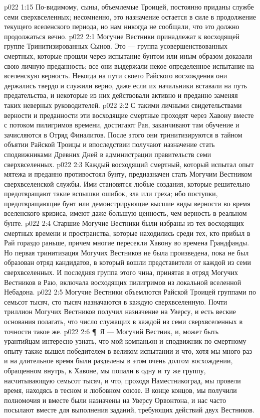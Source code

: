 \vs p022 1:15 По\hyp{}видимому, сыны, объемлемые Троицей, постоянно приданы службе семи сверхвселенных; несомненно, это назначение остается в силе в продолжение текущего вселенского периода, но нам никогда не сообщали, что это должно продолжаться вечно.
\vs p022 2:1 Могучие Вестники принадлежат к восходящей группе Тринитизированных Сынов. Это --- группа усовершенствованных смертных, которые прошли через испытание бунтом или иным образом доказали свою личную преданность; все они выдержали некое определенное испытание на вселенскую верность. Некогда на пути своего Райского восхождения они держались твердо и служили верно, даже если их начальники вставали на путь предательства, и некоторые из них действовали активно и преданно заменяя таких неверных руководителей.
\vs p022 2:2 С такими личными свидетельствами верности и преданности эти восходящие смертные проходят через Хавону вместе с потоком пилигримов времени, достигают Рая, заканчивают там обучение и зачисляются в Отряд Финалитов. После этого они тринитизируются в тайном объятии Райской Троицы и впоследствии получают назначение стать сподвижниками Древних Дней в администрации правительств семи сверхвселенных.
\vs p022 2:3 Каждый восходящий смертный, который испытал опыт мятежа и преданно противостоял бунту, предназначен стать Могучим Вестником сверхвселенской службы. Ими становятся любые создания, которые решительно предотвращают такие вспышки ошибок, зла или греха; ибо поступки, предотвращающие бунт или демонстрирующие высшие виды верности во время вселенского кризиса, имеют даже большую ценность, чем верность в реальном бунте.
\vs p022 2:4 Старшие Могучие Вестники были избраны из тех восходящих смертных времени и пространства, которые находились среди тех, кто прибыл в Рай гораздо раньше, причем многие пересекли Хавону во времена Грандфанды. Но первая тринитизация Могучих Вестников не была произведена, пока не был образован отряд кандидатов, в который вошли представители от каждой из семи сверхвселенных. И последняя группа этого чина, принятая в отряд Могучих Вестников в Раю, включала восходящих пилигримов из локальной вселенной Небадона.
\vs p022 2:5 Могучие Вестники объемлются Райской Троицей группами по семьсот тысяч, сто тысяч назначаются в каждую сверхвселенную. Почти триллион Могучих Вестников получил назначение на Уверсу, и есть веские основания полагать, что число служащих в каждой из семи сверхвселенных в точности такое же.
\vs p022 2:6 \P\ Я --- Могучий Вестник, и, может быть урантийцам интересно узнать, что мой компаньон и сподвижник по смертному опыту также вышел победителем в великом испытании и что, хотя мы много раз и на длительное время были разделены в этом очень долгом восхождении, обращенном внутрь, к Хавоне, мы попали в одну и ту же группу, насчитывающую семьсот тысяч, и что, проходя Наместникоград, мы провели время, находясь в тесном и любовном союзе. В конце концов, мы получили полномочия и вместе были назначены на Уверсу Орвонтона, и нас часто посылают вместе для выполнения заданий, требующих действий двух Вестников.
